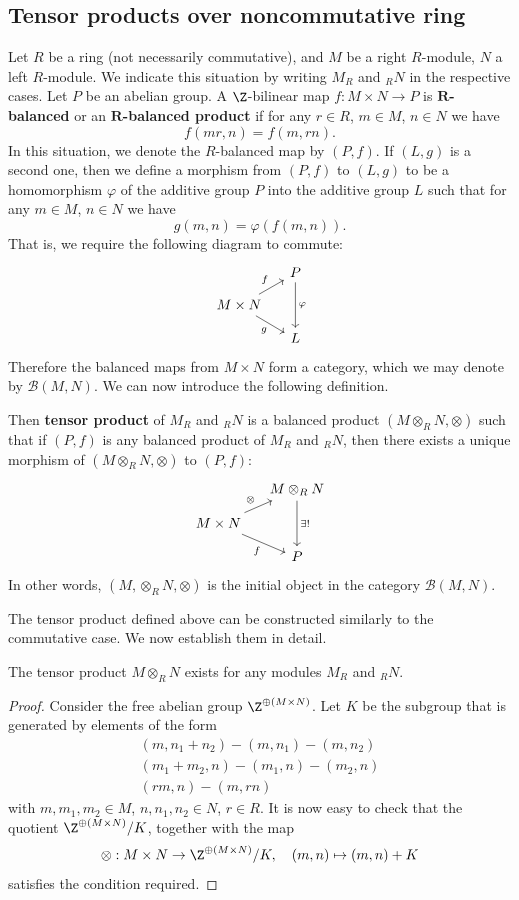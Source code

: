 \subsection{Tensor products over noncommutative ring}
Let $R$ be a ring (not necessarily commutative), and $M$ be a right $R$-module, $N$ a left $R$-module. We indicate this situation by writing $M_R$ and $_{R}N$ in the respective cases. Let $P$ be an abelian group. A $\Z$-bilinear map $f:M\times N\to P$ is \textbf{$\bm{R}$-balanced} or an \textbf{$\bm{R}$-balanced product} if for any $r\in R$, $m\in M$, $n\in N$ we have
\[f(mr,n)=f(m,rn).\]
In this situation, we denote the $R$-balanced map by $(P,f)$. If $(L,g)$ is a second one, then we define a morphism from $(P,f)$ to $(L,g)$ to be a homomorphism $\varphi$ of the additive group $P$ into the additive group $L$ such that for any $m\in M$, $n\in N$ we have
\[g(m,n)=\varphi(f(m,n)).\]
That is, we require the following diagram to commute:
\[\begin{tikzcd}[column sep=small, row sep=small]
&P\ar[dd,"\varphi"]\\
M\times N\ar[rd,swap,"g"]\ar[ru,"f"]&\\
&L
\end{tikzcd}\]
Therefore the balanced maps from $M\times N$ form a category, which we may denote by $\mathcal{B}(M,N)$. We can now introduce the following definition.
\begin{definition}
Then \textbf{tensor product} of $M_{R}$ and $_{R}N$ is a balanced product $(M\otimes_RN,\otimes)$ such that if $(P,f)$ is any balanced product of $M_{R}$ and $_{R}N$, then there exists a unique morphism of $(M\otimes_{R}N,\otimes)$ to $(P,f)$:
\[\begin{tikzcd}[column sep=small, row sep=small]
&M\otimes_{R}N\ar[dd,"\exists!"]\\
M\times N\ar[rd,swap,"f"]\ar[ru,"\otimes"]&\\
&P
\end{tikzcd}\]
In other words, $(M,\otimes_{R}N,\otimes)$ is the initial object in the category $\mathcal{B}(M,N)$.
\end{definition}
The tensor product defined above can be constructed similarly to the commutative case. We now establish them in detail.
\begin{proposition}
The tensor product $M\otimes_RN$ exists for any modules $M_{R}$ and $_{R}N$.
\end{proposition}
\begin{proof}
Consider the free abelian group $\Z^{\oplus(M\times N)}$. Let $K$ be the subgroup that is generated by elements of the form
\[\begin{array}{c}
(m,n_1+n_2)-(m,n_1)-(m,n_2)\\
(m_1+m_2,n)-(m_1,n)-(m_2,n)\\
(rm,n)-(m,rn)
\end{array}\]
with $m,m_1,m_2\in M$, $n,n_1,n_2\in N$, $r\in R$. It is now easy to check that the quotient $\Z^{\oplus(M\times N)}/K$, together with the map
\[\otimes:M\times N\to \Z^{\oplus(M\times N)}/K,\quad(m,n)\mapsto(m,n)+K\]
satisfies the condition required.
\end{proof}
